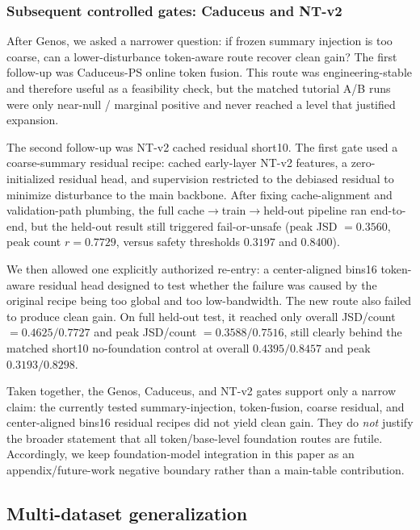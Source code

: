 \documentclass[11pt,a4paper]{article}
\begin{document}
\subsubsection{Subsequent controlled gates: Caduceus and NT-v2}

After Genos, we asked a narrower question: if frozen summary injection is
too coarse, can a lower-disturbance token-aware route recover clean gain?
The first follow-up was Caduceus-PS online token fusion. This route was
engineering-stable and therefore useful as a feasibility check, but the
matched tutorial A/B runs were only near-null / marginal positive and
never reached a level that justified expansion.

The second follow-up was NT-v2 cached residual short10. The first gate
used a coarse-summary residual recipe: cached early-layer NT-v2 features,
a zero-initialized residual head, and supervision restricted to the
debiased residual to minimize disturbance to the main backbone. After
fixing cache-alignment and validation-path plumbing, the full
cache$\rightarrow$train$\rightarrow$held-out pipeline ran end-to-end, but the
held-out result still triggered fail-or-unsafe
(peak JSD \(= 0.3560\), peak count \(r = 0.7729\), versus safety
thresholds \(0.3197\) and \(0.8400\)).

We then allowed one explicitly authorized re-entry: a center-aligned
bins16 token-aware residual head designed to test whether the failure was
caused by the original recipe being too global and too low-bandwidth. The
new route also failed to produce clean gain. On full held-out test, it
reached only overall JSD/count \(= 0.4625 / 0.7727\) and peak
JSD/count \(= 0.3588 / 0.7516\), still clearly behind the matched
short10 no-foundation control at overall \(0.4395 / 0.8457\) and peak
\(0.3193 / 0.8298\).

Taken together, the Genos, Caduceus, and NT-v2 gates support only a
narrow claim: the currently tested summary-injection, token-fusion,
coarse residual, and center-aligned bins16 residual recipes did not
yield clean gain. They do \emph{not} justify the broader statement that
all token/base-level foundation routes are futile. Accordingly, we keep
foundation-model integration in this paper as an appendix/future-work
negative boundary rather than a main-table contribution.

\subsection{Multi-dataset generalization}
\label{sec:multi-dataset}
\end{document}
